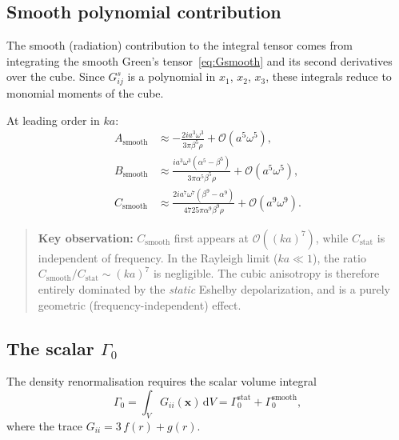 \documentclass[11pt,a4paper]{article}
\newcommand{\bx}{\mathbf{x}}
\newcommand{\dd}{\mathrm{d}}
\newcommand{\order}[1]{\mathcal{O}\!\left(#1\right)}
\begin{document}
\subsection{Smooth polynomial contribution}
\label{sec:smooth_contrib}

The smooth (radiation) contribution to the integral tensor comes
from integrating the smooth Green's tensor~\eqref{eq:Gsmooth} and
its second derivatives over the cube. Since $G^s_{ij}$ is a
polynomial in $x_1$, $x_2$, $x_3$, these integrals reduce to
monomial moments of the cube.

At leading order in $ka$:
\begin{align}
  A_\text{smooth} &\approx
    -\frac{2i a^3 \omega^3}{3\pi\beta^5\rho}
  + \order{a^5\omega^5},
  \label{eq:Asmooth} \\[6pt]
  B_\text{smooth} &\approx
    \frac{i a^3 \omega^3(\alpha^5 - \beta^5)}
         {3\pi\alpha^5\beta^5\rho}
  + \order{a^5\omega^5},
  \label{eq:Bsmooth} \\[6pt]
  C_\text{smooth} &\approx
    \frac{2i a^7 \omega^7(\beta^9 - \alpha^9)}
         {4725\pi\alpha^9\beta^9\rho}
  + \order{a^9\omega^9}.
  \label{eq:Csmooth}
\end{align}

\begin{quote}
\textbf{Key observation:} $C_\text{smooth}$ first appears at
$\order{(ka)^7}$, while $C_\text{stat}$ is independent of
frequency. In the Rayleigh limit ($ka \ll 1$), the ratio
$C_\text{smooth}/C_\text{stat} \sim (ka)^7$ is negligible. The
cubic anisotropy is therefore entirely dominated by the
\emph{static} Eshelby depolarization, and is a purely geometric
(frequency-independent) effect.
\end{quote}

\subsection{The scalar \texorpdfstring{$\Gamma_0$}{Gamma\_0}}
\label{sec:gamma0}

The density renormalisation requires the scalar volume integral
\begin{equation}
  \Gamma_0 = \int_V G_{ii}(\bx)\,\dd V
  = \Gamma_0^\text{stat} + \Gamma_0^\text{smooth},
  \label{eq:Gamma0}
\end{equation}
where the trace $G_{ii} = 3\,f(r) + g(r)$.
\end{document}
